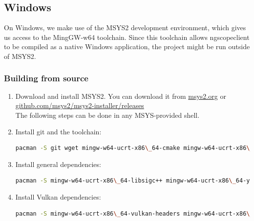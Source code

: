 \subsection{Windows}

On Windows, we make use of the MSYS2 development environment, which gives us access to the MingGW-w64 toolchain.
Since this toolchain allows ngscopeclient to be compiled as a native Windows application, the project might be run
outside of MSYS2.

\subsubsection{Building from source}

\begin{enumerate}

\item Download and install MSYS2. You can download it from \href{https://www.msys2.org/}{msys2.org} or
\href{https://github.com/msys2/msys2-installer/releases}{github.com/msys2/msys2-installer/releases}\\


The following steps can be done in any MSYS-provided shell.


\item Install git and the toolchain:
\begin{lstlisting}[language=sh, numbers=none]
pacman -S git wget mingw-w64-ucrt-x86\_64-cmake mingw-w64-ucrt-x86\_64-toolchain
\end{lstlisting}

\item Install general dependencies:
\begin{lstlisting}[language=sh, numbers=none]
pacman -S mingw-w64-ucrt-x86\_64-libsigc++ mingw-w64-ucrt-x86\_64-yaml-cpp mingw-w64-ucrt-x86\_64-glfw mingw-w64-ucrt-x86\_64-catch mingw-w64-ucrt-x86\_64-hidapi mingw-w64-ucrt-x86\_64-libpng
\end{lstlisting}

\item Install Vulkan dependencies:
\begin{lstlisting}[language=sh, numbers=none]
pacman -S mingw-w64-ucrt-x86\_64-vulkan-headers mingw-w64-ucrt-x86\_64-vulkan-loader mingw-w64-ucrt-x86\_64-shaderc mingw-w64-ucrt-x86\_64-glslang mingw-w64-ucrt-x86\_64-spirv-tools
\end{lstlisting}


\end{enumerate}
